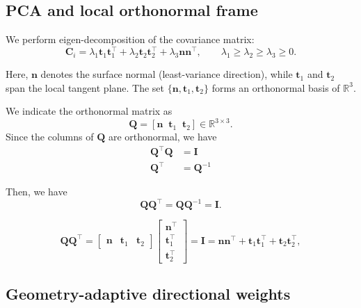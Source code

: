 \subsection{PCA and local orthonormal frame}
We perform eigen-decomposition of the covariance matrix:
\begin{equation}
\mathbf{C}_i
=
\lambda_1 \mathbf{t}_1 \mathbf{t}_1^\top
+
\lambda_2 \mathbf{t}_2 \mathbf{t}_2^\top
+
\lambda_3 \mathbf{n}\mathbf{n}^\top,
\qquad
\lambda_1 \ge \lambda_2 \ge \lambda_3 \ge 0 .
\end{equation}

Here, \(\mathbf{n}\) denotes the surface normal (least-variance direction), while
\(\mathbf{t}_1\) and \(\mathbf{t}_2\) span the local tangent plane. The set
\(\{\mathbf{n}, \mathbf{t}_1, \mathbf{t}_2\}\) forms an orthonormal basis of
\(\mathbb{R}^3\).




We indicate the orthonormal matrix as
\begin{equation}
\mathbf{Q} = [ \mathbf{n}\;\; \mathbf{t}_1\;\; \mathbf{t}_2 ] \in \mathbb{R}^{3\times 3}.
\end{equation}
Since the columns of \(\mathbf{Q}\) are orthonormal, we have
\begin{equation}
\begin{split}
    \mathbf{Q}^\top \mathbf{Q} &= \mathbf{I} \\
    \mathbf{Q}^\top &= \mathbf{Q}^{-1}
\end{split}
\end{equation}

Then, we have 
\begin{equation}
\mathbf{Q}\mathbf{Q}^\top = \mathbf{Q}\mathbf{Q}^{-1} = \mathbf{I}.
\end{equation}

\begin{equation}
\mathbf{Q}\mathbf{Q}^\top  = \begin{bmatrix}
\mathbf{n} & \mathbf{t}_1 & \mathbf{t}_2
\end{bmatrix}\begin{bmatrix}
\mathbf{n}^\top \\ \mathbf{t}_1^\top \\ \mathbf{t}_2^\top
\end{bmatrix} = 
\mathbf{I} =
\mathbf{n}\mathbf{n}^\top
+
\mathbf{t}_1\mathbf{t}_1^\top
+
\mathbf{t}_2\mathbf{t}_2^\top,
\end{equation}


\subsection{Geometry-adaptive directional weights}

